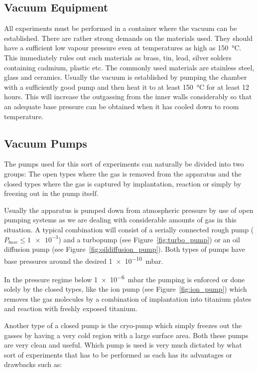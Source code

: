 \subsection{Vacuum Equipment}
All experiments must be performed in a container where the vacuum can be established. There are rather strong demands on the materials used. They should have a sufficient low vapour pressure even at temperatures as high as \SI{150}{\degreeCelsius}. This immediately rules out such materials as brass, tin, lead, silver solders containing cadmium, plastic etc. The commonly used materials are stainless steel, glass and ceramics. Usually the vacuum is established by pumping the chamber with a sufficiently good pump and then heat it to at least \SI{150}{\degreeCelsius} for at least 12 hours. This will increase the outgassing from the inner walls considerably so that an adequate base pressure can be obtained when it has cooled down to room temperature.

\subsection{Vacuum Pumps}
The pumps used for this sort of experiments can naturally be divided into two groups: The open types where the gas is removed from the apparatus and the closed types where the gas is captured by implantation, reaction or simply by freezing out in the pump itself.

Usually the apparatus is pumped down from atmospheric pressure by use of open pumping systems as we are dealing with considerable amounts of gas in this situation. A typical combination will consist of a serially connected rough pump ($P_{base} \leq \num{1e-3}$) and a turbopump (see Figure~\ref{fig:turbo_pump}) or an oil diffusion pump (see Figure~\ref{fig:oildiffusion_pump}). Both types of pumps have base pressures around the desired \SI{1e-10}{mbar}.

In the pressure regime below \SI{1e-6}{mbar} the pumping is enforced or done solely by the closed types, like the ion pump (see Figure~\ref{fig:ion_pump}) which removes the gas molecules by a combination of implantation into titanium plates and reaction with freshly exposed titanium.

Another type of a closed pump is the cryo-pump which simply freezes out the gasses by having a very cold region with a large surface area. Both these pumps are very clean and useful. Which pump is used is very much dictated by what sort of experiments that has to be performed as each has its advantages or drawbacks such as:

